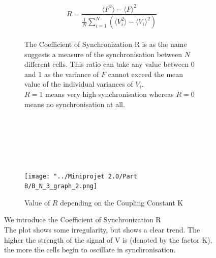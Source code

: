 \documentclass[10pt,a4paper,oneside,twocolumn]{article}
\numberwithin{equation}{section} %
\begin{document}
    \begin{figure}
    \centering
	    \begin{subfigure}[b]{0.35\textwidth}
	    \begin{equation*}R = \frac{\langle F^2 \rangle - {\langle F \rangle}^2}{\frac{1}{N}\sum_{i=1}^{N}(\langle V_i^2 \rangle - {\langle V_i \rangle}^2)} \end{equation*}
	    \hfill \\
	    \centering
	    \footnotesize{The Coefficient of Synchronization R is as the name suggests a measure of the synchronisation between $N$ different cells. This ratio can take any value between 0 and 1 as the variance of $F$ cannot exceed the mean value of the individual variances of $V_i$. \\
	    $R=1$ means very high synchronisation whereas $R=0$ means no synchronisation at all.}
	    \captionsetup{labelformat=empty}
	    \caption{\hfill \\ \hfill \\ \hfill \\} 	%
	\end{subfigure}
	~
	\begin{subfigure}[b]{0.4\textwidth}
	    \texttt{[image: "../Miniprojet 2.0/Part B/B\_N\_3\_graph\_2.png]}
	    \caption{\footnotesize{Value of $R$ depending on the Coupling Constant K}}
	\end{subfigure}
	\caption{We introduce the Coefficient of Synchronization R \\
	The plot shows some irregularity, but shows a clear trend. The higher the strength of the signal of V is (denoted by the factor K), the more the cells begin to oscillate in synchronisation.}
    \end{figure}
\end{document}
